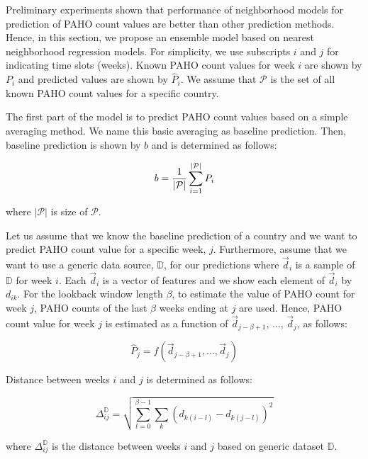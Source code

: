 
Preliminary experiments shown that performance of neighborhood models for prediction of PAHO count values are better than other prediction methods. Hence, in this section, we propose an ensemble model based on nearest neighborhood regression models. For simplicity, we use subscripts $i$ and $j$ for indicating time slots (weeks). Known PAHO count values for week $i$ are shown by $P_{i}$ and predicted values are shown by $\hat{P}_{i}$. We assume that $\mathcal{P}$ is the set of all known PAHO count values for a specific country.

The first part of the model is to predict PAHO count values based on a simple averaging method. We name this basic averaging as baseline prediction. Then, baseline prediction is shown by $b$ and is determined as follows:

\begin{equation}
b = {1 \over {|\mathcal{P}|}} \sum_{i=1}^{|\mathcal{P}|}P_{i}
\end{equation}

where $|\mathcal{P}|$ is size of $\mathcal{P}$. 

Let us assume that we know the baseline prediction of a country and we want to predict PAHO count value for a specific week, $j$. Furthermore, assume that we want to use a generic data source, $\mathbb{D}$, for our predictions where $\vec{d}_i$ is a sample of $\mathbb{D}$ for week $i$. Each $\vec{d}_i$ is a vector of features and we show each element of $\vec{d}_i$ by $d_{ik}$. For the lookback window length $\beta$, to estimate the value of PAHO count for week $j$, PAHO counts of the last $\beta$ weeks ending at $j$ are used. Hence, PAHO count value for week $j$ is estimated as a function of $\vec{d}_{j-\beta+1}$, ..., $\vec{d}_{j}$, as follows:

\begin{equation}
\hat{P}_{j} = \mathit{f}(\vec{d}_{j-\beta+1},...,\vec{d}_{j})
\end{equation}

Distance between weeks $i$ and $j$ is determined as follows:

\begin{equation}
\Delta_{ij}^\mathbb{D} = \sqrt{\sum_{l=0}^{\beta-1} \sum_{k} (d_{k(i-l)}-d_{k(j-l)})^2}
\end{equation}

where $\Delta_{ij}^\mathbb{D}$ is the distance between weeks $i$ and $j$ based on generic dataset $\mathbb{D}$.

